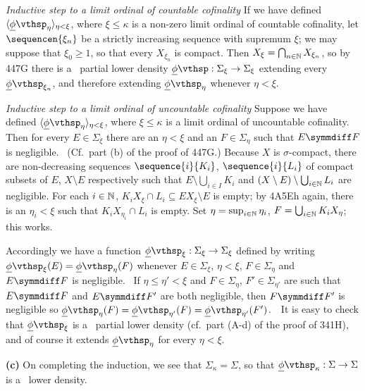 {\medskip

 {\it Inductive step to a limit ordinal of countable
cofinality\/} If we have defined
$\langle\undphi_{\eta}\rangle_{\eta<\xi}$, where $\xi\le\kappa$ is a
non-zero limit ordinal of countable cofinality, let $\sequencen{\xi_n}$
be a strictly increasing sequence with supremum $\xi$;  we may suppose
that $\xi_0\ge 1$, so that every $X_{\xi_n}$ is compact.   Then
$X_{\xi}=\bigcap_{n\in\Bbb N}X_{\xi_n}$, so by 447G there is a \lti\
partial lower density $\undphi:\Sigma_{\xi}\to\Sigma_{\xi}$ extending
every $\undphi_{\xi_n}$, and therefore extending $\undphi_{\eta}$
whenever $\eta<\xi$.

\medskip

 {\it Inductive step to a limit ordinal of uncountable
cofinality\/} Suppose we have defined
$\langle\undphi_{\eta}\rangle_{\eta<\xi}$, where $\xi\le\kappa$ is a
limit ordinal of uncountable cofinality.   Then for every
$E\in\Sigma_{\xi}$ there are an $\eta<\xi$ and an $F\in\Sigma_{\eta}$
such that $E\symmdiff F$ is negligible.   \Prf\ (Cf.\ part (b) of the
proof of 447G.)   Because $X$ is $\sigma$-compact, there are
non-decreasing sequences $\sequence{i}{K_i}$, $\sequence{i}{L_i}$ of
compact subsets of $E$, $X\setminus E$ respectively such that
$E\setminus\bigcup_{i\in I}K_i$ and
$(X\setminus E)\setminus\bigcup_{i\in\Bbb N}L_i$ are negligible.   For
each $i\in\Bbb N$, $K_iX_{\xi}\cap L_i\subseteq EX_{\xi}\setminus E$ is
empty;   by 4A5Eh again, there is an $\eta_i<\xi$ such that
$K_iX_{\eta_i}\cap L_i$ is empty.
Set $\eta=\sup_{i\in\Bbb N}\eta_i$, $F=\bigcup_{i\in\Bbb N}K_iX_{\eta}$;
this works.\ \Qed

Accordingly we have a function
$\undphi_{\xi}:\Sigma_{\xi}\to\Sigma_{\xi}$ defined by writing
$\undphi_{\xi}(E)=\undphi_{\eta}(F)$ whenever $E\in\Sigma_{\xi}$,
$\eta<\xi$, $F\in\Sigma_{\eta}$ and $E\symmdiff F$ is negligible.
\Prf\ If $\eta\le\eta'<\xi$ and $F\in\Sigma_{\eta}$,
$F'\in\Sigma_{\eta'}$ are such that $E\symmdiff F$ and $E\symmdiff F'$
are both negligible, then $F\symmdiff F'$ is negligible so
$\undphi_{\eta}(F)=\undphi_{\eta'}(F)=\undphi_{\eta'}(F')$.\ \QeD\   It
is easy to check that $\undphi_{\xi}$ is a \lti\ partial lower density
(cf.\ part (A-d) of the proof of 341H), and of course it extends
$\undphi_{\eta}$ for every $\eta<\xi$.

\medskip

{\bf (c)} On completing the induction, we see that
$\Sigma_{\kappa}=\Sigma$, so that $\undphi_{\kappa}:\Sigma\to\Sigma$ is
a \lti\ lower density.

}
